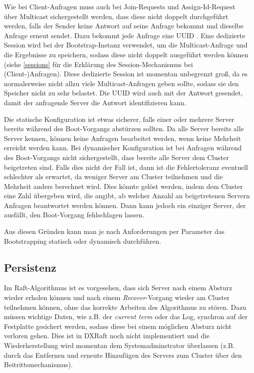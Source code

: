 Wie bei Client-Anfragen muss auch bei Join-Requests und Assign-Id-Request über Multicast sichergestellt werden, dass diese nicht doppelt durchgeführt werden, falls der Sender keine Antwort auf seine Anfrage bekommt und dieselbe Anfrage erneut sendet. Dazu bekommt jede Anfrage eine UUID \cite{uuid}. Eine dedizierte Session wird bei der Bootstrap-Instanz verwendet, um die Multicast-Anfrage und die Ergebnisse zu speichern, sodass diese nicht doppelt ausgeführt werden können (siehe \ref{sessions} für die Erklärung des Session-Mechanismus bei (Client-)Anfragen). Diese dedizierte Session ist momentan unbegrenzt groß, da es normalerweise nicht allzu viele Multicast-Anfragen geben sollte, sodass sie den Speicher nicht zu sehr belastet. Die UUID wird auch mit der Antwort gesendet, damit der anfragende Server die Antwort identifizieren kann.

Die statische Konfiguration ist etwas sicherer, falls einer oder mehrere  Server bereits während des Boot-Vorgangs abstürzen sollten. Da alle Server bereits alle Server kennen, können keine Anfragen bearbeitet werden, wenn keine Mehrheit erreicht werden kann. Bei dynamischer Konfiguration ist bei Anfragen während des Boot-Vorgangs nicht sichergestellt, dass bereits alle Server dem Cluster beigetreten sind. Falls dies nicht der Fall ist, dann ist die Fehlertoleranz eventuell schlechter als erwartet, da weniger Server am Cluster teilnehmen und die Mehrheit anders berechnet wird. Dies könnte gelöst werden, indem dem Cluster eine Zahl übergeben wird, die angibt, ab welcher Anzahl an beigetretenen Servern Anfragen beantwortet werden können. Dann kann jedoch ein einziger Server, der ausfällt, den Boot-Vorgang fehlschlagen lassen.

Aus diesen Gründen kann man je nach Anforderungen per Parameter das Bootstrapping statisch oder dynamisch durchführen.

\subsection{Persistenz}

Im Raft-Algorithmus ist es vorgesehen, dass sich Server nach einem Absturz wieder erholen können und nach einem \textit{Recover}-Vorgang wieder am Cluster teilnehmen können, ohne das korrekte Arbeiten des Algorithmus zu stören. Dazu müssen wichtige Daten, wie z.B. der \textit{current term} oder das Log, synchron auf der Festplatte gesichert werden, sodass diese bei einem möglichen Absturz nicht verloren gehen. Dies ist in DXRaft noch nicht implementiert und die Wiederherstellung wird momentan dem Systemadminstrator überlassen (z.B. durch das Entfernen und erneute Hinzufügen des Servers zum Cluster über den Beitrittsmechanismus).


